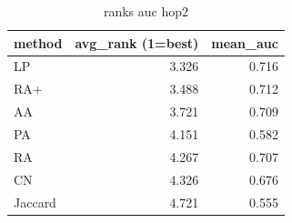 \begin{table}[t]
\centering
\caption{ranks auc hop2}
\label{tab:ranks_auc_hop2}
\begin{tabular}{lrr}
\hline
method & avg\_rank (1=best) & mean\_auc \\
\hline
LP & 3.326 & 0.716 \\
RA+ & 3.488 & 0.712 \\
AA & 3.721 & 0.709 \\
PA & 4.151 & 0.582 \\
RA & 4.267 & 0.707 \\
CN & 4.326 & 0.676 \\
Jaccard & 4.721 & 0.555 \\
\hline
\end{tabular}
\end{table}